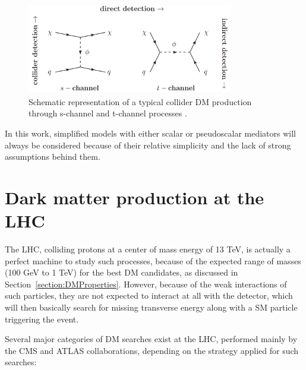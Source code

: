 \documentclass[a4paper, 10pt, openright]{report}
\begin{document}
\begin{figure}[htbp]
\begin{center}
\includegraphics[width=9cm, height=4cm]{figs/STChannels.png}
\caption{Schematic representation of a typical collider \ac{DM} production through s-channel and t-channel processes \cite{STChannels}.}
\label{fig:STChannels}
\end{center}
\end{figure}

In this work, simplified models with either scalar or pseudoscalar mediators will always be considered because of their relative simplicity and the lack of strong assumptions behind them.%

\section{Dark matter production at the LHC} \label{section:ourChannel}

The \ac{LHC}, colliding protons at a center of mass energy of 13 TeV, is actually a perfect machine to study such processes, because of the expected range of masses (100 GeV to 1 TeV) for the best \ac{DM} candidates, as discussed in Section~\ref{section:DMProperties}. However, because of the weak interactions of such particles, they are not expected to interact at all with the detector, which will then basically search for missing transverse energy along with a \ac{SM} particle triggering the event.

Several major categories of \ac{DM} searches exist at the \ac{LHC}, performed mainly by the \ac{CMS} and \ac{ATLAS} collaborations, depending on the strategy applied for such searches:
\end{document}
